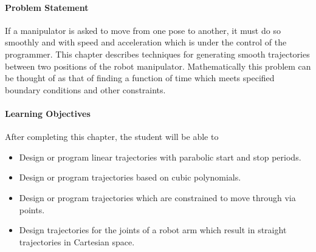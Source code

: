 
\paragraph{Problem Statement}
  
If a manipulator is asked to move from one pose to another, it must do so smoothly and with speed and acceleration which is under the control of the programmer.  
This chapter describes techniques for generating smooth trajectories between two positions of the robot manipulator.  Mathematically this problem can be thought of as that of finding a function of time which meets specified boundary conditions and other constraints.  

\paragraph{Learning Objectives} After completing this chapter, the student will be able to
\begin{itemize}
  \item Design or program linear trajectories with parabolic start and stop periods.
  \item Design or program trajectories based on cubic polynomials.
  \item Design or program trajectories which are constrained to move through via points.
  \item Design trajectories for the joints of a robot arm which result in straight trajectories in Cartesian space.
\end{itemize}